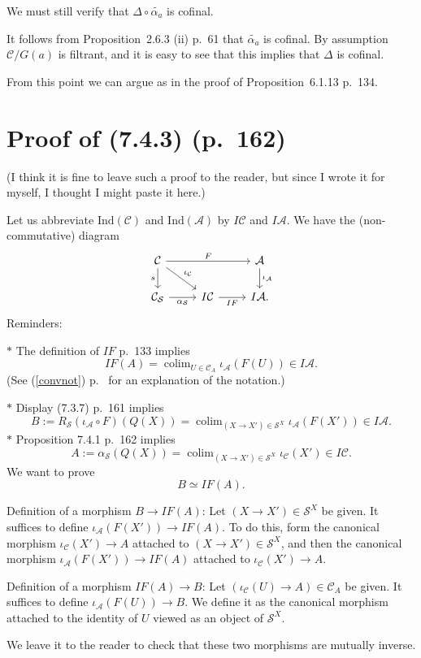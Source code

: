 \documentclass[12pt]{article}
\theoremstyle{remark}%
\newcommand{\n}{\noindent}
\newcommand{\A}{\mathcal A}
\newcommand{\C}{\mathcal C}
\newcommand{\SSS}{\mathcal S}
\newcommand{\pr}{Proposition}
\newcommand{\cn}{(See (\ref{convnot}) p.~\pageref{convnot} for an explanation of the notation.) }
\DeclareMathOperator*{\coli}{colim}
\begin{document}
We must still verify that $\Delta\circ\widetilde{\alpha_a}$ is cofinal. 

It follows from \pr\ 2.6.3 (ii) p.~61 that $\widetilde{\alpha_a}$ is cofinal. By assumption $\C/G(a)$ is filtrant, and it is easy to see that this implies that $\Delta$ is cofinal. 

From this point we can argue as in the proof of \pr\ 6.1.13 p.~134. 
%
\section{Proof of (7.4.3) (p.~162)}%
%
(I think it is fine to leave such a proof to the reader, but since I wrote it for myself, I thought I might paste it here.)

Let us abbreviate $\text{Ind}(\C)$ and $\text{Ind}(\A)$ by $I\C$ and $I\A$. We have the (non-commutative) diagram
$$
\begin{tikzcd}
\C\ar{rr}{F}\ar{d}[swap]{s}\ar{dr}{\iota_\C}&&\A\ar{d}{\iota_\A}\\ 
\C_\SSS\ar{r}[swap]{\alpha_\SSS}&I\C\ar{r}[swap]{IF}&I\A.
\end{tikzcd}
$$
Reminders:

\n$*$ The definition of $IF$ p.~133 implies
$$
IF(A)=\coli_{U\in\C_A}\iota_\A(F(U))\in I\A.
$$ 
\cn

\n $*$ Display (7.3.7) p.~161 implies
$$
B:=R_\SSS(\iota_\A\circ F)(Q(X))=\coli_{(X\to X')\in\SSS^X}\iota_\A(F(X'))\in I\A.
$$
$*$ Proposition 7.4.1 p.~162 implies
$$
A:=\alpha_\SSS(Q(X))=\coli_{(X\to X')\in\SSS^X}\iota_\C(X')\in I\C.
$$
We want to prove 
$$
B\simeq IF(A).
$$

Definition of a morphism $B\to IF(A)$: Let $(X\to X')\in\SSS^X$ be given. It suffices to define 
$\iota_\A(F(X'))\to IF(A)$. To do this, form the canonical morphism $\iota_\C(X')\to A$ attached to $(X\to X')\in\SSS^X$, and then the canonical morphism $\iota_\A(F(X'))\to IF(A)$ attached to $\iota_\C(X')\to A$. 

Definition of a morphism $IF(A)\to B$: Let $(\iota_\C(U)\to A)\in\C_A$ be given. It suffices to define $\iota_\A(F(U))\to B$. We define it as the canonical morphism attached to the identity of $U$ viewed as an object of $\SSS^X$.

We leave it to the reader to check that these two morphisms are mutually inverse. 
%
\end{document}

